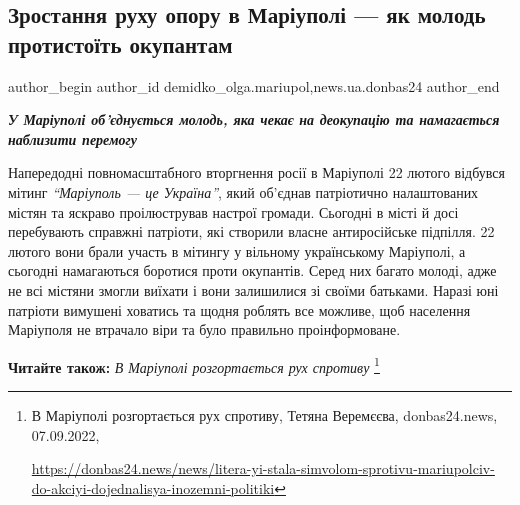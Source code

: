  
 
 
 
 
 
\subsection{Зростання руху опору в Маріуполі — як молодь протистоїть окупантам}
\label{sec:19_09_2022.stz.news.ua.donbas24.1.zrostannja_ruhu_oporu_mrpl_molod_protystoit_okupantam}
 
\ifcmt
 author_begin
   author_id demidko_olga.mariupol,news.ua.donbas24
 author_end
\fi


\begin{center}
  \em\bfseries\Large
У Маріуполі об'єднується молодь, яка чекає на деокупацію та намагається наблизити перемогу 
\end{center}

Напередодні повномасштабного вторгнення росії в Маріуполі 22 лютого відбувся
мітинг \emph{\enquote{Маріуполь — це Україна}}, який об'єднав патріотично налаштованих містян
та яскраво проілюстрував настрої громади. Сьогодні в місті й досі перебувають
справжні патріоти, які створили власне антиросійське підпілля. 22 лютого вони
брали участь в мітингу у вільному українському Маріуполі, а сьогодні
намагаються боротися проти окупантів. Серед них багато молоді, адже не всі
містяни змогли виїхати і вони залишилися зі своїми батьками. Наразі юні
патріоти вимушені ховатись та щодня роблять все можливе, щоб населення
Маріуполя не втрачало віри та було правильно проінформоване.

\textbf{Читайте також:} \emph{В Маріуполі розгортається рух спротиву}%
\footnote{В Маріуполі розгортається рух спротиву, Тетяна Веремєєва, donbas24.news, 07.09.2022, \par%
\url{https://donbas24.news/news/litera-yi-stala-simvolom-sprotivu-mariupolciv-do-akciyi-dojednalisya-inozemni-politiki}%
}


